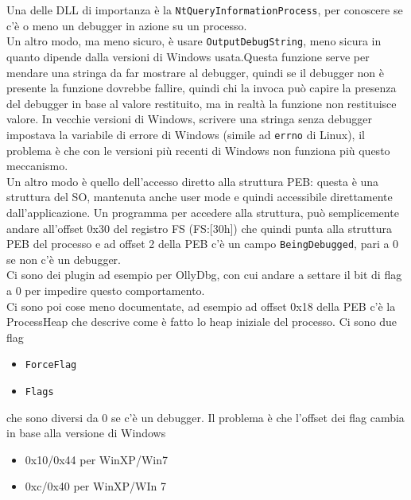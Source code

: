 \documentclass[12pt, oneside]{extbook}
\begin{document}
Una delle DLL di importanza è la \texttt{NtQueryInformationProcess}, per conoscere se c'è o meno un debugger in azione su un processo.\\Un altro modo, ma meno sicuro, è usare \texttt{OutputDebugString}, meno sicura in quanto dipende dalla versioni di Windows usata.Questa funzione serve per mendare una stringa da far mostrare al debugger, quindi se il debugger non è presente la funzione dovrebbe fallire, quindi chi la invoca può capire la presenza del debugger in base al valore restituito, ma in realtà la funzione non restituisce valore. In vecchie versioni di Windows, scrivere una stringa senza debugger impostava la variabile di errore di Windows (simile ad \texttt{errno} di Linux), il problema è che con le versioni più recenti di Windows non funziona più questo meccanismo.\\Un altro modo è quello dell'accesso diretto alla struttura PEB: questa è una struttura del SO, mantenuta anche user mode e quindi accessibile direttamente dall'applicazione. Un programma per accedere alla struttura, può semplicemente andare all'offset 0x30 del registro FS (FS:[30h]) che quindi punta alla struttura PEB del processo e ad offset 2 della PEB c'è un campo \texttt{BeingDebugged}, pari a 0 se non c'è un debugger.\\Ci sono dei plugin ad esempio per OllyDbg, con cui andare a settare il bit di flag a 0 per impedire questo comportamento.\\Ci sono poi cose meno documentate, ad esempio ad offset 0x18 della PEB c'è la ProcessHeap che descrive come è fatto lo heap iniziale del processo. Ci sono due flag
\begin{itemize}
\item \texttt{ForceFlag}
\item \texttt{Flags}
\end{itemize}
che sono diversi da 0 se c'è un debugger. Il problema è che l'offset dei flag cambia in base alla versione di Windows
\begin{itemize}
\item 0x10/0x44 per WinXP/Win7
\item 0xc/0x40 per WinXP/WIn 7
\end{itemize}
\end{document}
